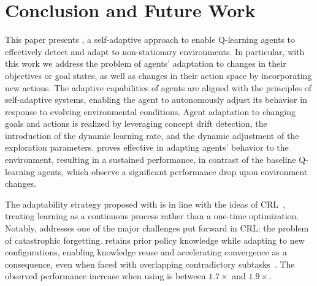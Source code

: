 
\section{Conclusion and Future Work}
\label{sec:conclusion}

This paper presents \adaptiverl, a self-adaptive approach to enable Q-learning agents to effectively 
detect and adapt to non-stationary environments. In particular, with this work we address the problem 
of agents' adaptation to changes in their objectives or goal states, as well as changes in their action 
space by incorporating new actions.
The adaptive capabilities of \adaptiverl agents are aligned with the principles of self-adaptive systems, 
enabling the agent to autonomously adjust its behavior in response to evolving environmental 
conditions.
Agent adaptation to changing goals and actions is realized by leveraging concept drift detection, the 
introduction of the dynamic learning rate, and the dynamic adjustment of the exploration parameters. 
\adaptiverl proves effective in adapting agents' behavior to the environment, resulting in a sustained 
performance, in contrast of the baseline Q-learning agents, which observe a significant performance 
drop upon environment changes. 

The adaptability strategy proposed with \adaptiverl is in line with the ideas of 
\ac{CRL}~\cite{abel2023definitioncontinualreinforcementlearning}, treating learning as a continuous 
process rather than a one-time optimization. Notably, \adaptiverl addresses one of the major 
challenges put forward in \ac{CRL}: the problem of catastrophic forgetting. \adaptiverl retains prior 
policy knowledge while adapting to new configurations, enabling knowledge reuse and accelerating 
convergence as a consequence, even when faced with overlapping contradictory 
subtasks~\citet{Bagus2022}. The observed performance increase when using \adaptiverl is between 
$1.7\times$ and $1.9\times$.

